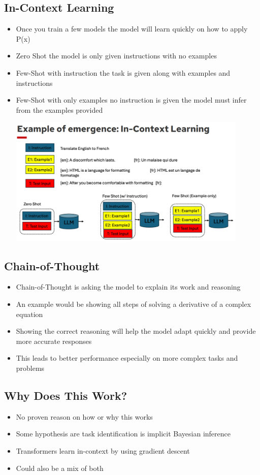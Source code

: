 \documentclass[11pt]{article}
\begin{document}
\subsection*{In-Context Learning}
\begin{itemize}
    \item Once you train a few models the model will learn quickly on how to apply P(x)
    \item Zero Shot the model is only given instructions with no examples
    \item Few-Shot with instruction the task is given along with examples and instructions
    \item Few-Shot with only examples no instruction is given the model must infer from the examples provided
    
    
    \includegraphics[width=0.9\textwidth]{notesimage2.PNG}
\end{itemize}

\subsection*{Chain-of-Thought}
\begin{itemize}
    \item Chain-of-Thought is asking the model to explain its work and reasoning
    \item An example would be showing all steps of solving a derivative of a complex equation
    \item Showing the correct reasoning will help the model adapt quickly and provide more accurate responses
    \item This leads to better performance especially on more complex tasks and problems
\end{itemize}

\subsection*{Why Does This Work?}
\begin{itemize}
    \item No proven reason on how or why this works
    \item Some hypothesis are task identification is implicit Bayesian inference
    \item Transformers learn in-context by using gradient descent
    \item Could also be a mix of both
\end{itemize}
\end{document}
